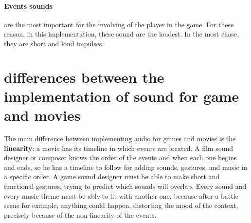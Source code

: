 \paragraph{Events sounds} are the most important for the involving of the player in the game. For these reason, in this implementation, these sound are the loudest. In the most chase, they are short and loud impulses.

\section{differences between the implementation of sound for game and movies}
The main difference between implementing audio for games and movies is the \textbf{linearity}: a movie has its timeline in which events are located. A film sound designer or composer knows the order of the events and when each one begins and ends, so he has a timeline to follow for adding sounds, gestures, and music in a specific order. A game sound designer must be able to make short and functional gestures, trying to predict which sounds will overlap. Every sound and every music theme must be able to fit with another one, because after a battle scene for example, anything could happen, distorting the mood of the context, precisely because of the non-linearity of the events.

